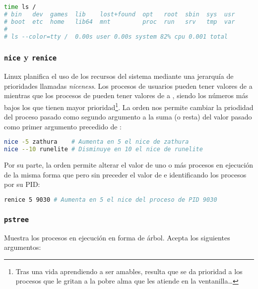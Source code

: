 \begin{lstlisting}[language=Bash]
time ls /
# bin   dev  games  lib    lost+found  opt   root  sbin  sys  usr
# boot  etc  home   lib64  mnt         proc  run   srv   tmp  var
#
# ls --color=tty /  0.00s user 0.00s system 82% cpu 0.001 total
\end{lstlisting}

\subsubsection{\texttt{nice} y \texttt{renice}}

Linux planifica el uso de los recursos del sistema mediante una jerarquía de prioridades llamadas \emph{niceness}.
Los procesos de usuarios pueden tener valores  de  a  mientras que los procesos de  pueden tener valores de  a , siendo los números más bajos los que tienen mayor prioridad\footnote{Tras una vida aprendiendo a ser amables, resulta que se da prioridad a los procesos que le gritan a la pobre alma que les atiende en la ventanilla\ldots}.
La orden  nos permite cambiar la priodidad del proceso pasado como segundo argumento a la suma (o resta) del valor pasado como primer argumento precedido de \code{-}:

\begin{lstlisting}[language=Bash]
nice -5 zathura    # Aumenta en 5 el nice de zathura
nice --10 runelite # Disminuye en 10 el nice de runelite
\end{lstlisting}

Por su parte, la orden  permite alterar el valor de uno o más procesos en ejecución de la misma forma que  pero sin preceder el valor de \code{-} e identificando los procesos por su PID\@:

\begin{lstlisting}[language=Bash]
renice 5 9030 # Aumenta en 5 el nice del proceso de PID 9030
\end{lstlisting}

\subsubsection{\texttt{pstree}}

Muestra los procesos en ejecución en forma de árbol.
Acepta los siguientes argumentos:

